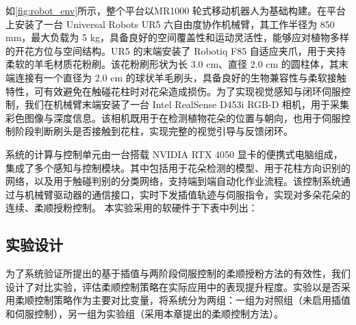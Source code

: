 如\cref{fig:robot_env}所示，整个平台以MR1000 轮式移动机器人为基础构建。在平台上安装了一台 Universal Robots UR5 六自由度协作机械臂，其工作半径为 850 mm，最大负载为 5 kg，具备良好的空间覆盖性和运动灵活性，能够应对植物多样的开花方位与空间结构。UR5 的末端安装了 Robotiq F85 自适应夹爪，用于夹持柔软的羊毛材质花粉刷。该花粉刷形状为长 3.0 cm、直径 2.0 cm 的圆柱体，其末端连接有一个直径为 2.0 cm 的球状羊毛刷头，具备良好的生物兼容性与柔软接触特性，可有效避免在触碰花柱时对花朵造成损伤。为了实现视觉感知与闭环伺服控制，我们在机械臂末端安装了一台 Intel RealSense D453i RGB-D 相机，用于采集彩色图像与深度信息。该相机既用于在检测植物花朵的位置与朝向，也用于伺服控制阶段判断刷头是否接触到花柱，实现完整的视觉引导与反馈闭环。

系统的计算与控制单元由一台搭载 NVIDIA RTX 4050 显卡的便携式电脑组成，集成了多个感知与控制模块。其中包括用于花朵检测的模型、用于花柱方向识别的网络，以及用于触碰判别的分类网络，支持端到端自动化作业流程。该控制系统通过与机械臂驱动器的通信接口，实时下发插值轨迹与伺服指令，实现对多朵花朵的连续、柔顺授粉控制。
本实验采用的软硬件于下表中列出：
\begin{table}[htbp]
	\caption[柔顺授粉控制软硬件]{柔顺授粉控制软硬件}
	\label{tab:pollination_env}
\end{table}
\subsection{实验设计}
为了系统验证所提出的基于插值与两阶段伺服控制的柔顺授粉方法的有效性，我们设计了对比实验，评估柔顺控制策略在实际应用中的表现提升程度。实验以是否采用柔顺控制策略作为主要对比变量，将系统分为两组：一组为对照组（未启用插值和伺服控制），另一组为实验组（采用本章提出的柔顺控制方法）。

